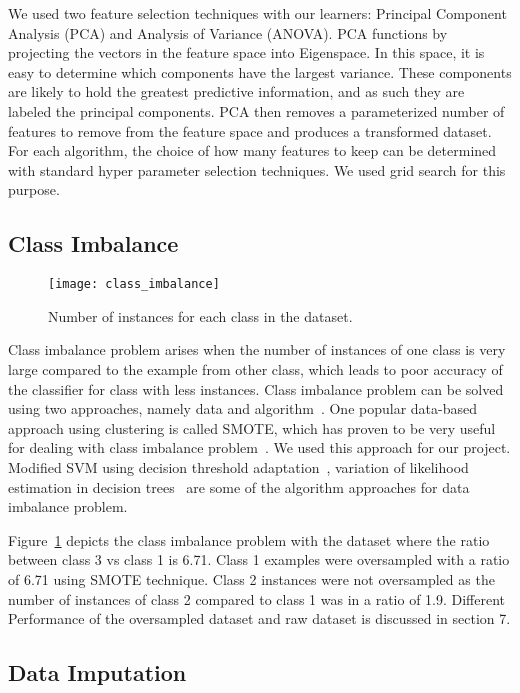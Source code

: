 \documentclass[conference]{IEEEtran}
\begin{document}
We used two feature selection techniques with our learners: Principal Component Analysis (PCA) and Analysis of Variance (ANOVA). PCA functions by projecting the vectors in the feature space into Eigenspace. In this space, it is easy to determine which components have the largest variance. These components are likely to hold the greatest predictive information, and as such they are labeled the principal components. PCA then removes a parameterized number of features to remove from the feature space and produces a transformed dataset.%
For each algorithm, the choice of how many features to keep can be determined with standard hyper parameter selection techniques. We used grid search for this purpose.

\subsection{Class Imbalance}

\begin{figure}[htpb]
	\centering
	\texttt{[image: class\_imbalance]}
	\caption{Number of instances for each class in the dataset.}
	\label{fig:class_imbalance}
\end{figure}

Class imbalance problem arises when the number of instances of one class is very large compared to the example from other class, which leads to poor accuracy of the classifier for class with less instances. Class imbalance problem can be solved using two approaches, namely data and algorithm~\cite{purwar-2014}. One popular data-based approach using clustering is called SMOTE, which has proven to be very useful for dealing with class imbalance problem~\cite{smote-2012}. We used this approach for our project. Modified SVM using decision threshold adaptation~\cite{wu-2003, raskutti-2004}, variation of likelihood estimation in decision trees~\cite{weiss-2003} are some of the algorithm approaches for data imbalance problem.

Figure~\ref{fig:class_imbalance} depicts the class imbalance problem with the dataset where the ratio between class 3 vs class 1 is 6.71. Class 1 examples were oversampled with a ratio of 6.71 using SMOTE technique. Class 2 instances were not oversampled as the number of instances of class 2 compared to class 1 was in a ratio of 1.9. Different Performance of the oversampled dataset and raw dataset is discussed in section 7.

\subsection{Data Imputation}
\end{document}
